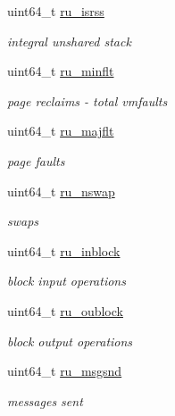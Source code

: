 \begin{DoxyCompactItemize}
uint64\_\-t \hyperlink{structTru64_1_1rusage_a63957e8e1508b676b26994bb6e6359f7}{ru\_\-isrss}
\begin{DoxyCompactList}\small\item\em integral unshared stack  \item\end{DoxyCompactList}\item 
uint64\_\-t \hyperlink{structTru64_1_1rusage_a9f685fa333aba8f0d8011e7e3432e37a}{ru\_\-minflt}
\begin{DoxyCompactList}\small\item\em page reclaims -\/ total vmfaults \item\end{DoxyCompactList}\item 
uint64\_\-t \hyperlink{structTru64_1_1rusage_af792eaad91f67fd7d350c542e688e504}{ru\_\-majflt}
\begin{DoxyCompactList}\small\item\em page faults \item\end{DoxyCompactList}\item 
uint64\_\-t \hyperlink{structTru64_1_1rusage_abf406f2a6065ca24836b3b2c9adeb881}{ru\_\-nswap}
\begin{DoxyCompactList}\small\item\em swaps \item\end{DoxyCompactList}\item 
uint64\_\-t \hyperlink{structTru64_1_1rusage_a1ee829a3685f9d009c73b1f1a8aa8955}{ru\_\-inblock}
\begin{DoxyCompactList}\small\item\em block input operations \item\end{DoxyCompactList}\item 
uint64\_\-t \hyperlink{structTru64_1_1rusage_a9eddb1aed5f3e17217da06d264f01970}{ru\_\-oublock}
\begin{DoxyCompactList}\small\item\em block output operations \item\end{DoxyCompactList}\item 
uint64\_\-t \hyperlink{structTru64_1_1rusage_a39008dba683527b4369224fecc4bc17b}{ru\_\-msgsnd}
\begin{DoxyCompactList}\small\item\em messages sent \item\end{DoxyCompactList}\item 

\end{DoxyCompactItemize}
